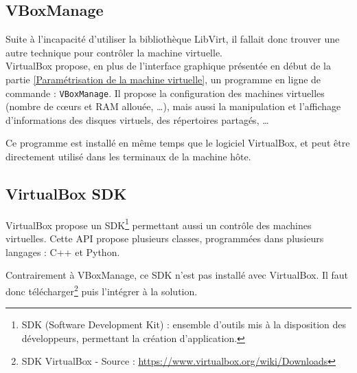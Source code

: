 
\subsection{VBoxManage}
\label{VBoxManage}

Suite à l'incapacité d'utiliser la bibliothèque LibVirt, il fallait donc trouver une autre technique pour contrôler la machine virtuelle.
\\


VirtualBox propose, en plus de l'interface graphique présentée en début de la partie \ref{Paramétrisation de la machine virtuelle}, un programme en ligne de commande : \lstinline{VBoxManage}.
Il propose la configuration des machines virtuelles (nombre de cœurs et RAM allouée, \ldots), mais aussi la manipulation et l'affichage d'informations des disques virtuels, des répertoires partagés, \ldots

Ce programme est installé en même temps que le logiciel VirtualBox, et peut être directement utilisé dans les terminaux de la machine hôte.
\\





\subsection{VirtualBox SDK}

VirtualBox propose un SDK\footnote{SDK (Software Development Kit) : ensemble d'outils mis à la disposition des développeurs, permettant la création d'application.} permettant aussi un contrôle des machines virtuelles.
Cette API propose plusieurs classes, programmées dans plusieurs langages : C++ et Python.

Contrairement à VBoxManage, ce SDK n'est pas installé avec VirtualBox.
Il faut donc télécharger\footnote{SDK VirtualBox - Source : \href{https://www.virtualbox.org/wiki/Downloads}{https://www.virtualbox.org/wiki/Downloads}} puis l'intégrer à la solution.
\\




